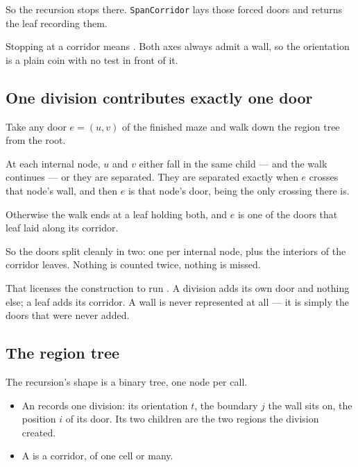 So the recursion stops there. \texttt{SpanCorridor} lays those forced doors and
returns the leaf recording them.



\begin{keypoint}
Stopping at a corridor means . Both axes always admit a wall, so the orientation is a
plain coin with no test in front of it.
\end{keypoint}

\subsection{One division contributes exactly one door}
\label{sec:one-door-per-division}

Take any door $e=(u,v)$ of the finished maze and walk down the region tree from
the root.

At each internal node, $u$ and $v$ either fall in the same child --- and the
walk continues --- or they are separated. They are separated exactly when $e$
crosses that node's wall, and then $e$ is that node's door, being the only
crossing there is.

Otherwise the walk ends at a leaf holding both, and $e$ is one of the doors that
leaf laid along its corridor.

So the doors split cleanly in two: one per internal node, plus the interiors of
the corridor leaves. Nothing is counted twice, nothing is missed.

\begin{keypoint}
That licenses the construction to run . A division adds its
own door and nothing else; a leaf adds its corridor. A wall is never represented
at all --- it is simply the doors that were never added.
\end{keypoint}

\subsection{The region tree}

The recursion's shape is a binary tree, one node per call.

\begin{itemize}[leftmargin=*,itemsep=3pt]
  \item An  records one division: its orientation $t$,
        the boundary $j$ the wall sits on, the position $i$ of its door. Its two
        children are the two regions the division created.
  \item A  is a corridor, of one cell or many.
\end{itemize}

